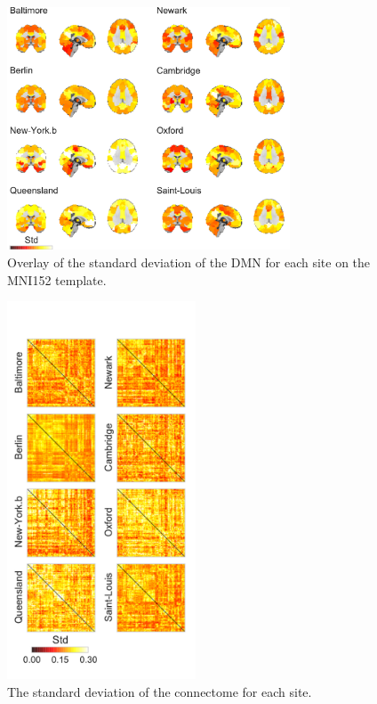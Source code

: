 \documentclass[authoryear]{elsarticle}
\begin{document}
\begin{figure}[tbp]
\centering
\includegraphics[width=0.75\textwidth]{../figures/dmn_stdmultisite.pdf}
\caption[]{
Overlay of the standard deviation of the DMN for each site on the MNI152 template.
}
\label{fig_std_DMNs}
\end{figure}

\begin{figure}[tbp]
\centering
\includegraphics[width=0.50\textwidth]{../figures/connectome_std_multisite2.pdf}
\caption[]{
The standard deviation of the connectome for each site.
}
\label{fig_std_connectomes}
\end{figure}
\end{document}
